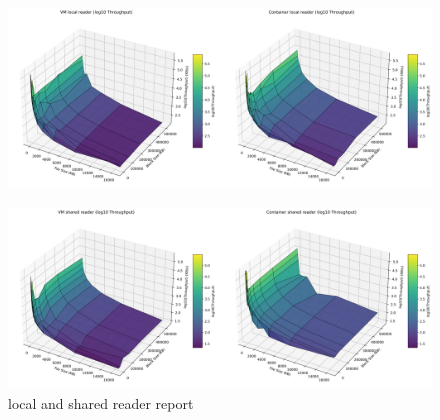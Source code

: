 \begin{figure}[H]
    \centering
    \includegraphics[width=\linewidth]{assets/VM local reader_Container local reader_log_surfaces.png}
    \end{figure}
\begin{figure}[H]
    \centering
    \includegraphics[width=\linewidth]{assets/VM shared reader_Container shared reader_log_surfaces.png}
    \caption{local and shared reader report}
    \label{fig:reader local and shared}
\end{figure}


